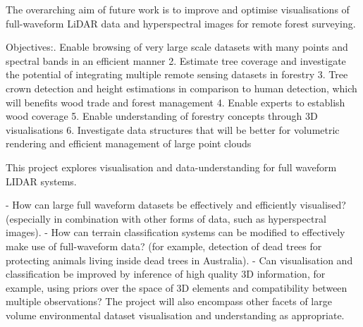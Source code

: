 \documentclass{subfiles}
\begin{document}
The overarching aim of future work is to improve and optimise visualisations of full-waveform LiDAR data and hyperspectral images for remote forest surveying.

Objectives:.	Enable browsing of very large scale datasets with many points and spectral bands in an efficient manner
2.	Estimate tree coverage and investigate the potential of integrating multiple remote sensing datasets in forestry
3.	Tree crown detection and height estimations in comparison to human detection, which will benefits wood trade and forest management
4.	Enable experts to establish wood coverage 
5.	Enable understanding of forestry concepts through 3D visualisations
6.	Investigate data structures that will be better for volumetric rendering and efficient management of large point clouds

This project explores visualisation and data-understanding for full waveform LIDAR systems. 

- How can large full waveform datasets be effectively and efficiently visualised? (especially in combination with other forms of data, such as hyperspectral images).
- How can terrain classification systems can be modified to effectively make use of full-waveform data? (for example, detection of dead trees for protecting animals living inside dead trees in Australia).  
- Can visualisation and classification be improved by inference of high quality 3D information, for example, using priors over the space of 3D elements and compatibility between multiple observations?
The project will also encompass other facets of large volume environmental dataset visualisation and understanding as appropriate.
\end{document}
